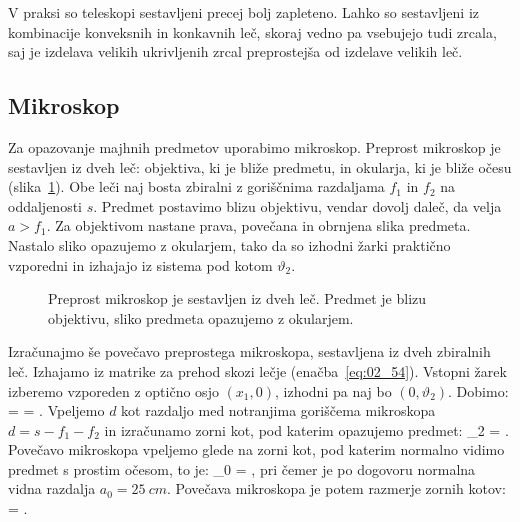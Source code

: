 V praksi so teleskopi sestavljeni precej bolj zapleteno. Lahko so sestavljeni iz kombinacije
konveksnih in konkavnih leč, skoraj vedno pa vsebujejo tudi zrcala, saj je izdelava
velikih ukrivljenih zrcal preprostejša od izdelave velikih leč. 

\subsection*{Mikroskop}
Za opazovanje majhnih predmetov uporabimo mikroskop. Preprost mikroskop je sestavljen
iz dveh leč: objektiva, ki je bliže predmetu, in okularja, ki je bliže očesu 
(slika~\ref{fig:02_mikroskop}). Obe leči naj bosta zbiralni z goriščnima razdaljama $f_1$ in $f_2$ na oddaljenosti $s$. Predmet
postavimo blizu objektivu, vendar dovolj daleč, da velja $a>f_1$. Za objektivom 
nastane prava, povečana in obrnjena slika predmeta. Nastalo sliko opazujemo z okularjem, 
tako da so izhodni žarki praktično vzporedni in izhajajo iz sistema pod kotom $\vartheta_2$.
\begin{figure}[ht]
\centering
\def\svgwidth{100truemm} 

\caption{Preprost mikroskop je sestavljen iz dveh leč. Predmet je blizu objektivu, sliko
predmeta opazujemo z okularjem.}
\label{fig:02_mikroskop}
\end{figure}

Izračunajmo še povečavo preprostega mikroskopa, sestavljena iz dveh zbiralnih leč. Izhajamo
iz matrike za prehod skozi lečje (enačba~\ref{eq:02_54}). Vstopni žarek izberemo vzporeden
z optično osjo $(x_1, 0)$, izhodni pa naj bo $(0, \vartheta_2)$. Dobimo:
\beq
{} = 
\cdot
\left[\begin{array}{c}
x_1\\
0
\end{array}\right]  = 
\!\!.
\label{eq:02_67}
\eeq
Vpeljemo $d$ kot razdaljo med notranjima goriščema mikroskopa
$d= s -f_1-f_2$ in izračunamo zorni kot, pod katerim opazujemo predmet:
\beq
\vartheta_2 = .
\label{eq:02_69}
\eeq
Povečavo mikroskopa vpeljemo glede na zorni kot, pod katerim 
normalno vidimo predmet s prostim očesom, to je:
\beq
\vartheta_0 = ,
\label{eq:02_70}
\eeq
pri čemer je po dogovoru normalna vidna razdalja $a_0 = 25~\si{cm}$.
Povečava mikroskopa je potem razmerje zornih kotov:
\beq
{} = .
\eeq

